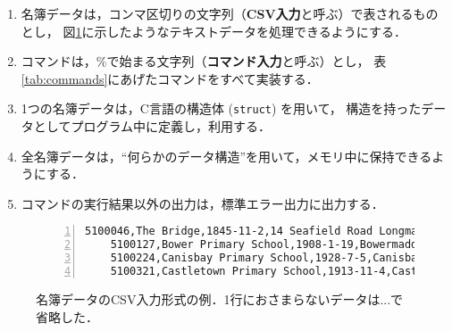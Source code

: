 \documentclass[autodetect-engine,dvi=dvipdfmx,ja=standard,
               a4j,11pt]{bxjsarticle}
\begin{document}
\begin{enumerate}
  \setlength{\parskip}{0em} \setlength{\itemsep}{0.25em}
    \item 名簿データは，コンマ区切りの文字列（\textbf{CSV入力}と呼ぶ）で表されるものとし，
          図\ref{fig:csvdata}に示したようなテキストデータを処理できるようにする．
    \item コマンドは，\%で始まる文字列（\textbf{コマンド入力}と呼ぶ）とし，
          表\ref{tab:commands}にあげたコマンドをすべて実装する．
    \item 1つの名簿データは，C言語の構造体 (\texttt{struct}) を用いて，
          構造を持ったデータとしてプログラム中に定義し，利用する．
    \item 全名簿データは，``何らかのデータ構造''を用いて，メモリ中に保持できるようにする．
    \item コマンドの実行結果以外の出力は，標準エラー出力に出力する．
\end{enumerate}

\begin{figure}[b]
\centering
\begin{Verbatim}[frame=single, xleftmargin=10mm, xrightmargin=5mm, gobble=4,
                 fontsize=\small, numbers=left, firstnumber=1]
    5100046,The Bridge,1845-11-2,14 Seafield Road Longman Inverness,SEN Unit 2.0 Open
    5100127,Bower Primary School,1908-1-19,Bowermadden Bower Caithness,01955 641225 ...
    5100224,Canisbay Primary School,1928-7-5,Canisbay Wick,01955 611337 Primary 56 3...
    5100321,Castletown Primary School,1913-11-4,Castletown Thurso,01847 821256 01847...
\end{Verbatim}
    \caption{名簿データのCSV入力形式の例．1行におさまらないデータは...で省略した．}
    \label{fig:csvdata}
\end{figure}
\end{document}
